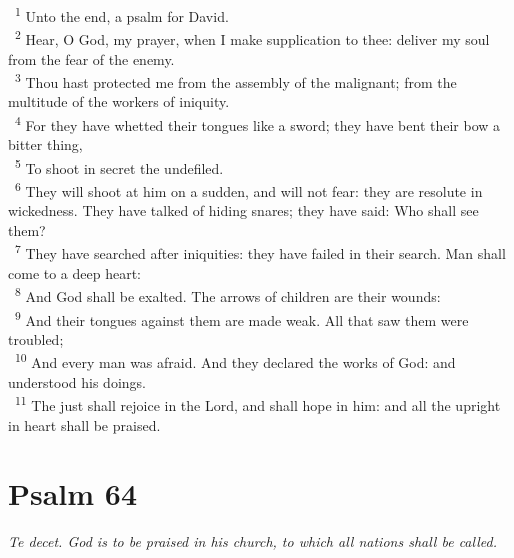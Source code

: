 \documentclass[a5paper,12pt]{article}
\begin{document}
\begin{multicols*}{2}
~\textsuperscript{1} Unto the end, a psalm for David.\\
~\textsuperscript{2} Hear, O God, my prayer, when I make supplication to thee: deliver my soul from the fear of the enemy.\\
~\textsuperscript{3} Thou hast protected me from the assembly of the malignant; from the multitude of the workers of iniquity.\\
~\textsuperscript{4} For they have whetted their tongues like a sword; they have bent their bow a bitter thing,\\
~\textsuperscript{5} To shoot in secret the undefiled.\\
~\textsuperscript{6} They will shoot at him on a sudden, and will not fear: they are resolute in wickedness. They have talked of hiding snares; they have said: Who shall see them?\\
~\textsuperscript{7} They have searched after iniquities: they have failed in their search. Man shall come to a deep heart:\\
~\textsuperscript{8} And God shall be exalted. The arrows of children are their wounds:\\
~\textsuperscript{9} And their tongues against them are made weak. All that saw them were troubled;\\
~\textsuperscript{10} And every man was afraid. And they declared the works of God: and understood his doings.\\
~\textsuperscript{11} The just shall rejoice in the Lord, and shall hope in him: and all the upright in heart shall be praised.\\

\section{Psalm 64}
\label{sec:org67ea504}
\emph{Te decet. God is to be praised in his church, to which all nations shall be called.}\\


\end{multicols*}
\end{document}

